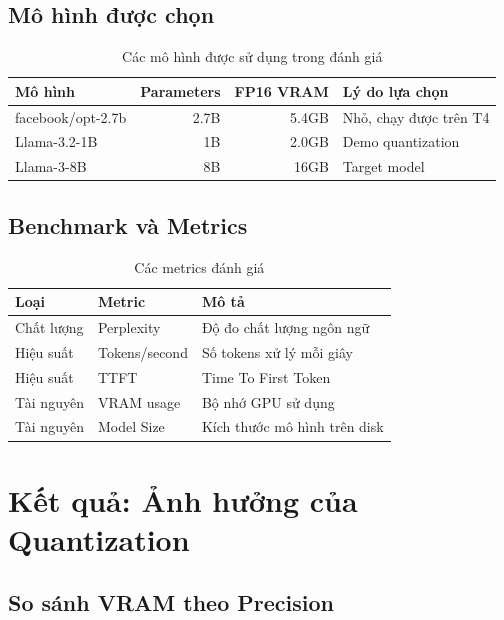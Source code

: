 \documentclass[12pt,a4paper]{report}
\begin{document}
\subsection{Mô hình được chọn}

\begin{table}[h]
\centering
\caption{Các mô hình được sử dụng trong đánh giá}
\label{tab:models-used}
\begin{tabular}{lrrl}
\toprule
\textbf{Mô hình} & \textbf{Parameters} & \textbf{FP16 VRAM} & \textbf{Lý do lựa chọn} \\
\midrule
facebook/opt-2.7b & 2.7B & 5.4GB & Nhỏ, chạy được trên T4 \\
Llama-3.2-1B & 1B & 2.0GB & Demo quantization \\
Llama-3-8B & 8B & 16GB & Target model \\
\bottomrule
\end{tabular}
\end{table}

\subsection{Benchmark và Metrics}

\begin{table}[h]
\centering
\caption{Các metrics đánh giá}
\label{tab:metrics}
\begin{tabular}{lll}
\toprule
\textbf{Loại} & \textbf{Metric} & \textbf{Mô tả} \\
\midrule
Chất lượng & Perplexity & Độ đo chất lượng ngôn ngữ \\
Hiệu suất & Tokens/second & Số tokens xử lý mỗi giây \\
Hiệu suất & TTFT & Time To First Token \\
Tài nguyên & VRAM usage & Bộ nhớ GPU sử dụng \\
Tài nguyên & Model Size & Kích thước mô hình trên disk \\
\bottomrule
\end{tabular}
\end{table}

\section{Kết quả: Ảnh hưởng của Quantization}

\subsection{So sánh VRAM theo Precision}
\end{document}
